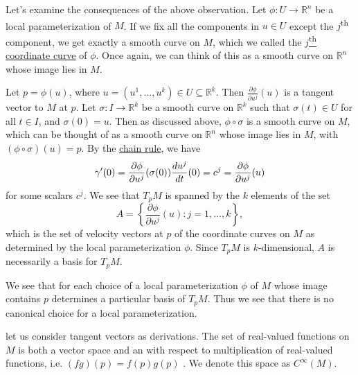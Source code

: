 \documentclass[notoc,notitlepage]{tufte-book}
\begin{document}
Let's examine the consequences of the above observation. Let $\phi : U \to
\mathbb{R}^n$ be a local parameterization of $M$. If we fix all the components in
$u \in U$ except the $j$\textsuperscript{th} component, we get exactly a smooth
curve on $M$, which we called the
\hyperref[defn:_j_th_coordinate_curve]{$j$\textsuperscript{th} coordinate
curve} of $\phi$. Once again, we can think of this as a smooth curve on
$\mathbb{R}^n$ whose image lies in $M$.

Let $p = \phi(u)$, where $u = (u^1, \ldots, u^k) \in U \subseteq \mathbb{R}^k$.
Then $\frac{\partial \phi}{\partial u^j} (u)$ is a tangent vector to $M$ at $p$.
Let $\sigma : I \to \mathbb{R}^k$ be a smooth curve on $\mathbb{R}^k$ such that
$\sigma(t) \in U$ for all $t \in I$, and $\sigma(0) = u$. Then as discussed
above, $\phi \circ \sigma$ is a smooth curve on $M$, which can be thought of as
a smooth curve on $\mathbb{R}^n$ whose image lies in $M$, with $(\phi \circ
\sigma)(u) = p$. By the \hyperref[thm:the_chain_rule]{chain rule}, we have
\begin{equation*}
  \gamma'(0) = \frac{\partial \phi}{\partial u^j} (\sigma(0))
  \frac{\mathop{}\!d{u^j}}{\mathop{}\!d{t}}(0) = c^j = \frac{\partial \phi}{\partial u^j} (u)
\end{equation*}
for some scalars $c^j$. We see that $T_p M$ is spanned by the $k$ elements of
the set
\begin{equation*}
  A = \left\{ \frac{\partial \phi}{\partial u^j}(u) : j = 1, \ldots, k \right\},
\end{equation*}
which is the set of velocity vectors at $p$ of the coordinate curves on $M$ as
determined by the local parameterization $\phi$. Since $T_p M$ is 
$k$-dimensional, $A$ is necessarily a basis for $T_p M$.

We see that for each choice of a local parameterization $\phi$ of $M$ whose image
contains $p$ determines a particular basis of $T_p M$. Thus we see that there is
no canonical choice for a local parameterization.

 let us consider tangent vectors as derivations. The set of
real-valued functions on $M$ is both a vector space and an  with
respect to multiplication of real-valued functions, i.e. $(fg)(p) = f(p)g(p)$
. We denote this space as $C^\infty (M)$.
\end{document}
